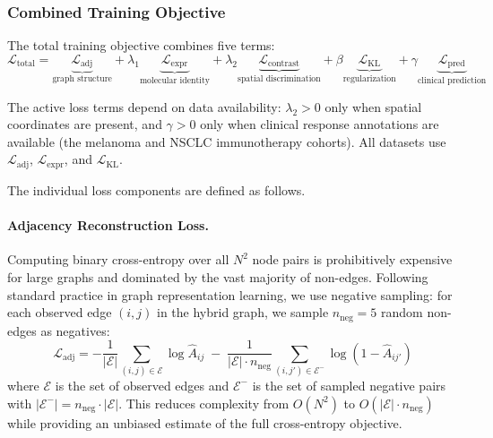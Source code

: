 \documentclass{article}
\newcommand{\KL}{\mathrm{KL}}
\begin{document}
\subsubsection{Combined Training Objective}

The total training objective combines five terms:
\begin{equation}
    \mathcal{L}_{\text{total}} = \underbrace{\mathcal{L}_{\text{adj}}}_{\text{graph structure}} + \lambda_1 \underbrace{\mathcal{L}_{\text{expr}}}_{\text{molecular identity}} + \lambda_2 \underbrace{\mathcal{L}_{\text{contrast}}}_{\text{spatial discrimination}} + \beta \underbrace{\mathcal{L}_{\KL}}_{\text{regularization}} + \gamma \underbrace{\mathcal{L}_{\text{pred}}}_{\text{clinical prediction}}
    \label{eq:total_loss}
\end{equation}

The active loss terms depend on data availability: $\lambda_2 > 0$ only when spatial coordinates are present, and $\gamma > 0$ only when clinical response annotations are available (the melanoma and NSCLC immunotherapy cohorts). All datasets use $\mathcal{L}_{\text{adj}}$, $\mathcal{L}_{\text{expr}}$, and $\mathcal{L}_{\KL}$.

The individual loss components are defined as follows.

\paragraph{Adjacency Reconstruction Loss.} Computing binary cross-entropy over all $N^2$ node pairs is prohibitively
expensive for large graphs and dominated by the vast majority of non-edges. Following standard practice in graph
representation learning, we use negative sampling: for each observed edge $(i,j)$ in the hybrid graph, we sample
$n_{\text{neg}} = 5$ random non-edges as negatives:
\begin{equation}
    \mathcal{L}_{\text{adj}} = -\frac{1}{|\mathcal{E}|} \sum_{(i,j) \in \mathcal{E}} \log \hat{A}_{ij} \;-\;
\frac{1}{|\mathcal{E}| \cdot n_{\text{neg}}} \sum_{(i,j') \in \mathcal{E}^{-}} \log(1 - \hat{A}_{ij'})
    \label{eq:adj_loss}
\end{equation}
where $\mathcal{E}$ is the set of observed edges and $\mathcal{E}^{-}$ is the set of sampled negative pairs with
$|\mathcal{E}^{-}| = n_{\text{neg}} \cdot |\mathcal{E}|$. This reduces complexity from $O(N^2)$ to $O(|\mathcal{E}| \cdot
n_{\text{neg}})$ while providing an unbiased estimate of the full cross-entropy objective.
\end{document}
